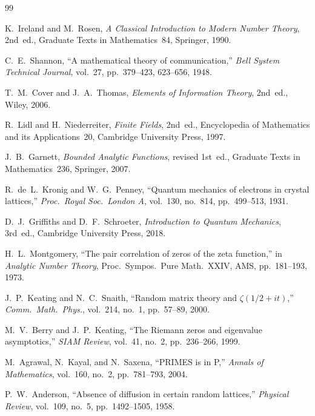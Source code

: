 \documentclass[11pt,twoside]{article}
\begin{document}
	\begin{thebibliography}{99}
		
		K.~Ireland and M.~Rosen, \textit{A Classical Introduction to Modern Number Theory}, 2nd~ed., Graduate Texts in Mathematics~84, Springer, 1990.
		
		C.~E.~Shannon, ``A mathematical theory of communication,'' \textit{Bell System Technical Journal}, vol.~27, pp.~379--423, 623--656, 1948.
		
		T.~M.~Cover and J.~A.~Thomas, \textit{Elements of Information Theory}, 2nd~ed., Wiley, 2006.
		
		R.~Lidl and H.~Niederreiter, \textit{Finite Fields}, 2nd~ed., Encyclopedia of Mathematics and its Applications~20, Cambridge University Press, 1997.
		
		J.~B.~Garnett, \textit{Bounded Analytic Functions}, revised 1st~ed., Graduate Texts in Mathematics~236, Springer, 2007.
		
		R.~de~L.~Kronig and W.~G.~Penney, ``Quantum mechanics of electrons in crystal lattices,'' \textit{Proc.\ Royal Soc.\ London A}, vol.~130, no.~814, pp.~499--513, 1931.
		
		D.~J.~Griffiths and D.~F.~Schroeter, \textit{Introduction to Quantum Mechanics}, 3rd~ed., Cambridge University Press, 2018.
		
		H.~L.~Montgomery, ``The pair correlation of zeros of the zeta function,'' in \textit{Analytic Number Theory}, Proc.\ Sympos.\ Pure Math.~XXIV, AMS, pp.~181--193, 1973.
		
		J.~P.~Keating and N.~C.~Snaith, ``Random matrix theory and $\zeta(1/2+it)$,'' \textit{Comm.\ Math.\ Phys.}, vol.~214, no.~1, pp.~57--89, 2000.
		
		M.~V.~Berry and J.~P.~Keating, ``The Riemann zeros and eigenvalue asymptotics,'' \textit{SIAM Review}, vol.~41, no.~2, pp.~236--266, 1999.
		
		M.~Agrawal, N.~Kayal, and N.~Saxena, ``PRIMES is in P,'' \textit{Annals of Mathematics}, vol.~160, no.~2, pp.~781--793, 2004.
		
		P.~W.~Anderson, ``Absence of diffusion in certain random lattices,'' \textit{Physical Review}, vol.~109, no.~5, pp.~1492--1505, 1958.
		
	\end{thebibliography}
	
\end{document}
